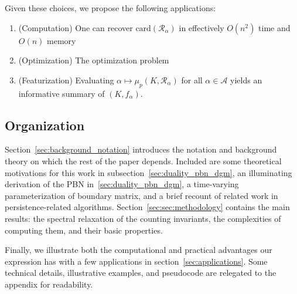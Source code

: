 \documentclass[12pt]{article}
\numberwithin{equation}{section}
\newcommand{\+}{%
	\raisebox{0.18ex}{\scaleobj{0.55}{+}}
}
\theoremstyle{definition}
\begin{document}
Given these choices, we propose the following applications:
\begin{enumerate}
	\item (Computation) One can recover $\mathrm{card}(\mathcal{R}_\alpha)$ in effectively $O(n^2)$ time and $O(n)$ memory 
	\item (Optimization) The optimization problem 
	\item (Featurization) Evaluating $\alpha \mapsto \mu_p(K, \mathcal{R}_\alpha)$ for all $\alpha \in \mathcal{A}$ yields an informative summary of $(K, f_\alpha)$.
\end{enumerate}


 

\subsection{Organization}
Section~\ref{sec:background_notation} introduces the notation and background theory on which the rest of the paper depends. Included are some theoretical motivations for this work in subsection~\ref{sec:duality_pbn_dgm}, an illuminating derivation of the PBN in~\ref{sec:duality_pbn_dgm}, a time-varying parameterization of boundary matrix, and a brief recount of related work in persistence-related algorithms.
Section~\ref{sec:sec:methodology} contains the main results: the spectral relaxation of the counting invariants, the complexities of computing them, and their basic properties.
  

Finally, we illustrate both the computational and practical advantages our expression has with a few applications in section~\ref{sec:applications}. 
Some technical details, illustrative examples, and pseudocode are relegated to the appendix for readability.
\end{document}
